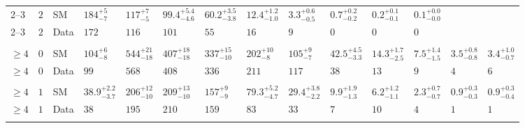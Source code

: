 \begin{landscape}
\begin{center}
\begin{table}[h!]
\begin{tabular}{ llllllllllllll }
    2--3                 & $2$      & SM   & $184^{+5}_{-7}$                &$117^{+7}_{-5}$    & $99.4^{+5.4}_{-4.6}$           & $60.2^{+3.5}_{-3.8}$           & $12.4^{+1.2}_{-1.0}$           & $3.3^{+0.6}_{-0.5}$            & $0.7^{+0.2}_{-0.2}$            & $0.2^{+0.1}_{-0.1}$            & $0.1^{+0.0}_{-0.0}$            \\
    2--3                 & $2$      & Data & $172$                          & $116$                          & $101$                          & $55$                           & $16$                           & $9$                            & $0$                            & $0$                            & $0$                            \\ \\
    $\geq 4$             & $0$      & SM   & $104^{+6}_{-8}$                & $544^{+21}_{-18}$              & $407^{+18}_{-18}$              & $337^{+15}_{-10}$              & $202^{+10}_{-8}$               & $105^{+9}_{-7}$                & $42.5^{+4.5}_{-3.3}$           & $14.3^{+1.7}_{-2.5}$           & $7.5^{+1.4}_{-1.5}$            & $3.5^{+0.8}_{-0.8}$            & $3.4^{+1.0}_{-0.7}$            \\ 
    $\geq 4$             & $0$      & Data & $99$                           & $568$                          & $408$                          & $336$                          & $211$                          & $117$                          & $38$                           & $13$                           & $9$                            & $4$                            & $6$                            \\\\
    $\geq 4$             & $1$      & SM   & $38.9^{+2.2}_{-3.7}$           & $206^{+12}_{-10}$              & $209^{+13}_{-10}$              & $157^{+9}_{-9}$                & $79.3^{+5.2}_{-4.7}$           & $29.4^{+3.8}_{-2.2}$           & $9.9^{+1.9}_{-1.3}$            & $6.2^{+1.2}_{-1.1}$            & $2.3^{+0.7}_{-0.7}$            & $0.9^{+0.3}_{-0.3}$            & $0.9^{+0.3}_{-0.4}$            \\ 
    $\geq 4$             & $1$      & Data & $38$                           & $195$                          & $210$                          & $159$                          & $83$                           & $33$                           & $7$                            & $10$                           & $4$                            & $1$                            & $1$                            \\\\

\end{tabular}
\end{table}
\end{center}
\end{landscape}
